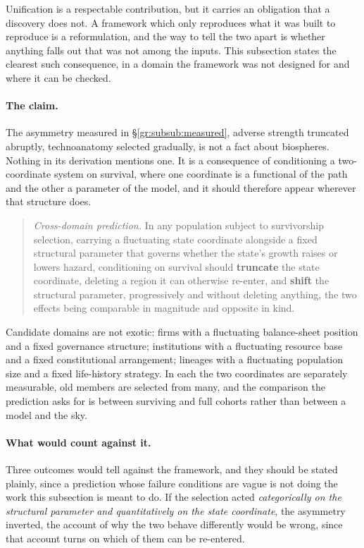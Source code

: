 \documentclass[11pt]{article}
\numberwithin{equation}{section}
\theoremstyle{plain}
\theoremstyle{definition}
\theoremstyle{remark}
\begin{document}
Unification is a respectable contribution, but it carries an obligation
that a discovery does not. A framework which only reproduces what it was
built to reproduce is a reformulation, and the way to tell the two apart
is whether anything falls out that was not among the inputs. This
subsection states the clearest such consequence, in a domain the
framework was not designed for and where it can be checked.

\paragraph{The claim.}

The asymmetry measured in \S\ref{gr:subsub:measured}, adverse
strength truncated abruptly, technoanatomy selected gradually, is not
a fact about biospheres. Nothing in its derivation mentions one. It is a
consequence of conditioning a two-coordinate system on survival, where
one coordinate is a functional of the path and the other a parameter of
the model, and it should therefore appear wherever that structure does.

\begin{quote}
\emph{Cross-domain prediction.} In any population subject to
survivorship selection, carrying a fluctuating state coordinate
alongside a fixed structural parameter that governs whether the state's
growth raises or lowers hazard, conditioning on survival should
\textbf{truncate} the state coordinate, deleting a region it can
otherwise re-enter, and \textbf{shift} the structural parameter,
progressively and without deleting anything, the two effects being
comparable in magnitude and opposite in kind.
\end{quote}

Candidate domains are not exotic: firms with a fluctuating balance-sheet
position and a fixed governance structure; institutions with a
fluctuating resource base and a fixed constitutional arrangement;
lineages with a fluctuating population size and a fixed life-history
strategy. In each the two coordinates are separately measurable, old
members are selected from many, and the comparison the prediction asks
for is between surviving and full cohorts rather than between a model
and the sky.

\paragraph{What would count against it.}

Three outcomes would tell against the framework, and they should be stated plainly, since a prediction whose failure conditions are vague
is not doing the work this subsection is meant to do. If the selection acted \emph{categorically on the structural parameter
and quantitatively on the state coordinate}, the asymmetry inverted, the account of why the two behave differently would be wrong, since
that account turns on which of them can be re-entered.
\end{document}
